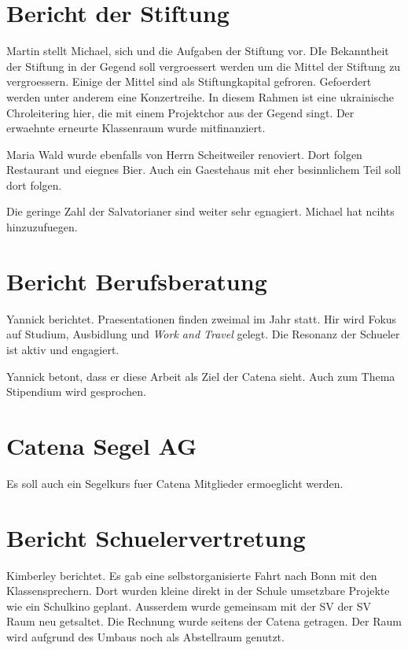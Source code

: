 \documentclass[a4paper, 11pt]{article}
\begin{document}
\section*{Bericht der Stiftung}

Martin stellt Michael, sich und die Aufgaben der Stiftung vor.
DIe Bekanntheit der Stiftung in der Gegend soll vergroessert werden um die Mittel der Stiftung zu vergroessern.
Einige der Mittel sind als Stiftungkapital gefroren. Gefoerdert werden unter anderem eine Konzertreihe.
In diesem Rahmen ist eine ukrainische Chroleitering hier, die mit einem Projektchor aus der Gegend singt.
Der erwaehnte erneurte Klassenraum wurde mitfinanziert.

Maria Wald wurde ebenfalls von Herrn Scheitweiler renoviert.
Dort folgen Restaurant und eiegnes Bier.
Auch ein Gaestehaus mit eher besinnlichem Teil soll dort folgen.

Die geringe Zahl der Salvatorianer sind weiter sehr egnagiert.
Michael hat ncihts hinzuzufuegen.

\section*{Bericht Berufsberatung}

Yannick berichtet.
Praesentationen finden zweimal im Jahr statt.
Hir wird Fokus auf Studium, Ausbidlung und \textit{Work and Travel} gelegt.
Die Resonanz der Schueler ist aktiv und engagiert.

Yannick betont, dass er diese Arbeit als Ziel der Catena sieht.
Auch zum Thema Stipendium wird gesprochen.

\section*{Catena Segel AG}

Es soll auch ein Segelkurs fuer Catena Mitglieder ermoeglicht werden.


\section*{Bericht Schuelervertretung}

Kimberley berichtet.
Es gab eine selbstorganisierte Fahrt nach Bonn mit den Klassensprechern.
Dort wurden kleine direkt in der Schule umsetzbare Projekte wie ein Schulkino geplant.
Ausserdem wurde gemeinsam mit der SV der SV Raum neu getsaltet.
Die Rechnung wurde seitens der Catena getragen.
Der Raum wird aufgrund des Umbaus noch als Abstellraum genutzt.
\end{document}
